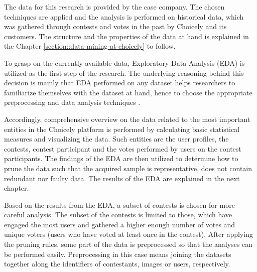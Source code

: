 The data for this research is provided by the case company. The chosen techniques are applied and the analysis is performed on historical data, which was gathered through contests and votes in the past by Choicely and its customers. The structure and the properties of the data at hand is explained in the Chapter \ref{section::data-mining-at-choicely} to follow.


To grasp on the currently available data, Exploratory Data Analysis (EDA) is utilized as the first step of the research. The underlying reasoning behind this decision is mainly that EDA performed on any dataset helps researchers to familiarize themselves with the dataset at hand, hence to choose the appropriate preprocessing and data analysis techniques \cite{introtodatamining}. 

Accordingly, comprehensive overview on the data related to the most important entities in the Choicely platform is performed by calculating basic statistical measures and visualizing the data. Such entities are the user profiles, the contests, contest participant and the votes performed by users on the contest participants. The findings of the EDA are then utilized to determine how to prune the data such that the acquired sample is representative, does not contain redundant nor faulty data. The results of the EDA are explained in the next chapter. 

Based on the results from the EDA, a subset of contests is chosen for more careful analysis. The subset of the contests is limited to those, which have engaged the most users and gathered a higher enough number of votes and unique voters (users who have voted at least once in the contest). After applying the pruning rules, some part of the data is preprocessed so that the analyses can be performed easily. Preprocessing in this case means joining the datasets together along the identifiers of contestants, images or users, respectively.  

